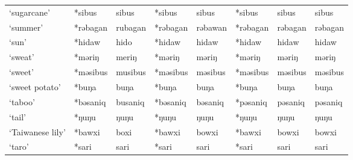 \begin{landscape}
\begin{longtable}[c]{@{}p{3cm}<{\raggedright}p{2.75cm}<{\raggedright}p{2.75cm}<{\raggedright}p{2.75cm}<{\raggedright}p{2.75cm}<{\raggedright}p{2.75cm}<{\raggedright}p{2.75cm}<{\raggedright}p{2.75cm}<{\raggedright}@{}}
`sugarcane'                                          & *sibus             & sibus                          & *sibus             & sibus                      & *sibus           & sibus                    & sibus                             \\
`summer'                                             & *rəbagan           & rubagan                        & *rəbagan           & rəbawan                    & *rəbagan         & rəbagan                  & rəbagan                           \\
`sun'                                                & *hidaw             & hido                           & *hidaw             & hidaw                      & *hidaw           & hidaw                    & hidaw                             \\
`sweat'                                              & *məriŋ             & meriŋ                          & *məriŋ             & məriŋ                      & *məriŋ           & məriŋ                    & məriŋ                             \\
`sweet'                                              & *məsibus           & musibus                        & *məsibus           & məsibus                    & *məsibus         & məsibus                  & məsibus                           \\
`sweet potato'                                       & *buŋa              & buŋa                           & *buŋa              & buŋa                       & *buŋa            & buŋa                     & buŋa                              \\
`taboo'                                              & *bəsaniq           & busaniq                        & *bəsaniq           & bəsaniq                    & *pəsaniq         & pəsaniq                  & pəsaniq                           \\
`tail'                                               & *ŋuŋu              & ŋuŋu                           & *ŋuŋu              & ŋuŋu                       & *ŋuŋu            & ŋuŋu                     & ŋuŋu                              \\
`Taiwanese lily'                                     & *bawxi             & boxi                           & *bawxi             & bowxi                      & *bawxi           & bowxi                    & bowxi                             \\
`taro'                                               & *sari              & sari                           & *sari              & sari                       & *sari            & sari                     & sari                              \\

\end{longtable}
\end{landscape}
